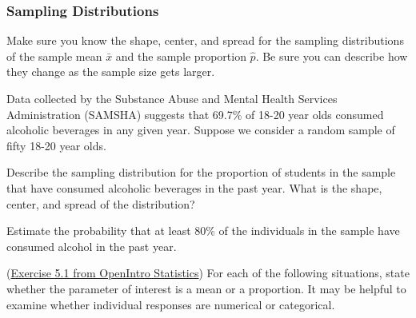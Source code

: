 \documentclass[12pt]{exam}
\newcounter{countA}
\begin{document}
\newpage
\subsubsection*{Sampling Distributions}\label{sampling-distributions}

Make sure you know the shape, center, and spread for the sampling
distributions of the sample mean \(\bar{x}\) and the sample proportion
\(\hat{p}\). Be sure you can describe how they change as the sample size
gets larger.

\begin{questions}
\setcounter{question}{\value{countA}}

\item
  Data collected by the Substance Abuse and Mental Health Services
  Administration (SAMSHA) suggests that 69.7\% of 18-20 year olds
  consumed alcoholic beverages in any given year. Suppose we consider a
  random sample of fifty 18-20 year olds.

  \begin{parts}
  \item
    Describe the sampling distribution for the proportion of students in the sample that have
    consumed alcoholic beverages in the past year. What is the shape,
    center, and spread of the distribution?
\vfill
  \item
    Estimate the probability that at least 80\% of the individuals in
    the sample have consumed alcohol in the past year.
\vfill
  \end{parts}
\item
  (\href{http://people.hsc.edu/faculty-staff/blins/books/OpenIntroStats4e.pdf\#eoce.5.1}{Exercise 5.1 from OpenIntro Statistics}) For each of the following situations, state whether the
  parameter of interest is a mean or a proportion. It may be helpful to
  examine whether individual responses are numerical or categorical.


\end{questions}
\end{document}
